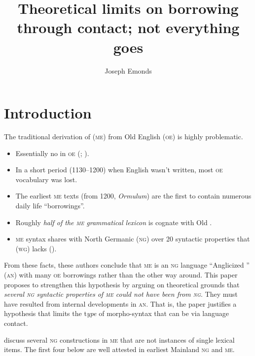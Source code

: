 \documentclass[output=paper]{LSP/langsci}
\author{Joseph Emonds\affiliation{Palacky University, Olomouc}}
\title{Theoretical limits on borrowing through contact; not everything goes}
\begin{document}
\section{Introduction}\label{sec:emonds:1} 




The traditional derivation of  (\textsc{me}) from Old English (\textsc{oe}) is highly problematic.


\begin{itemize}
\item Essentially no   in \textsc{oe}  (\citealt{Baugh2002}; \citealt{Strang1970}).
\end{itemize}

\begin{itemize}
\item In a short period (1130--1200) when English wasn’t written, most \textsc{oe} vocabulary was lost. 
\item The earliest \textsc{me} texts (from 1200, \textit{Ormulum}) are the first to contain numerous daily life  “borrowings”.
\item Roughly \textit{half of the \textsc{me} grammatical lexicon} is cognate with Old .
\item \textsc{me} syntax shares with North Germanic (\textsc{ng}) over 20 syntactic properties that  (\textsc{wg}) lacks  (\citealt{EmondsFaarlund2014}).
\end{itemize}

From these facts, these authors conclude that \textsc{me} is an \textsc{ng} language “Anglicized ” (\textsc{an}) with many \textsc{oe} borrowings rather than the other way around. This paper proposes to strengthen this hypothesis by arguing on theoretical grounds that \textit{several \textsc{ng} syntactic properties of \textsc{me} could not have been  from \textsc{ng}}. They must have resulted from internal developments in \textsc{an}. That is, the paper justifies a hypothesis that limits the t\textit{ype} of morpho-syntax that can be  via language contact. 

\citet{EmondsFaarlund2014} discuss several \textsc{ng} constructions in \textsc{me} that are not instances of single lexical items. The first four below are well attested in earliest Mainland \textsc{ng} and \textsc{me}.
\end{document}

